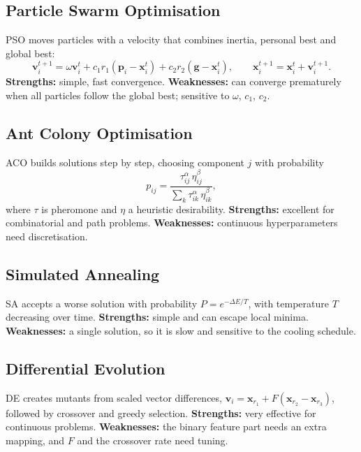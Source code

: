 \documentclass[12pt,a4paper]{article}
\numberwithin{equation}{section}
\numberwithin{table}{section}
\numberwithin{figure}{section}
\begin{document}
\subsection{Particle Swarm Optimisation}
PSO \cite{kennedy1995} moves particles with a velocity that combines inertia, personal best and global best:
\begin{equation}
  \mathbf{v}_i^{t+1} = \omega \mathbf{v}_i^t + c_1 r_1 (\mathbf{p}_i - \mathbf{x}_i^t) + c_2 r_2 (\mathbf{g} - \mathbf{x}_i^t), \qquad \mathbf{x}_i^{t+1} = \mathbf{x}_i^t + \mathbf{v}_i^{t+1}.
\end{equation}
\textbf{Strengths:} simple, fast convergence. \textbf{Weaknesses:} can converge prematurely when all particles follow the global best; sensitive to $\omega$, $c_1$, $c_2$.

\subsection{Ant Colony Optimisation}
ACO \cite{dorigo1996} builds solutions step by step, choosing component $j$ with probability
\begin{equation}
  p_{ij} = \frac{\tau_{ij}^{\alpha}\, \eta_{ij}^{\beta}}{\sum_{k} \tau_{ik}^{\alpha}\, \eta_{ik}^{\beta}},
\end{equation}
where $\tau$ is pheromone and $\eta$ a heuristic desirability. \textbf{Strengths:} excellent for combinatorial and path problems. \textbf{Weaknesses:} continuous hyperparameters need discretisation.

\subsection{Simulated Annealing}
SA \cite{kirkpatrick1983} accepts a worse solution with probability $P = e^{-\Delta E / T}$, with temperature $T$ decreasing over time. \textbf{Strengths:} simple and can escape local minima. \textbf{Weaknesses:} a single solution, so it is slow and sensitive to the cooling schedule.

\subsection{Differential Evolution}
DE \cite{storn1997} creates mutants from scaled vector differences, $\mathbf{v}_i = \mathbf{x}_{r_1} + F (\mathbf{x}_{r_2} - \mathbf{x}_{r_3})$, followed by crossover and greedy selection. \textbf{Strengths:} very effective for continuous problems. \textbf{Weaknesses:} the binary feature part needs an extra mapping, and $F$ and the crossover rate need tuning.
\end{document}
